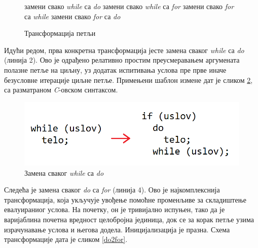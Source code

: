 \documentclass[a4paper]{article}
\newenvironment{algoritam}[1][htb]
{\renewcommand{\algorithmcfname}{Алгоритам}
\begin{figure}[ht]
\centering
  \begin{minipage}{.75\linewidth}
	\begin{algorithm}[#1]%
  }{\end{algorithm}
  \end{minipage}
\end{figure}}
\begin{document}
\begin{algoritam}[H]
\SetAlgoLined
\DontPrintSemicolon
{}
     {замени свако \textit{while} са \textit{do}}
\;
     {замени свако \textit{while} са \textit{for}}
\;
     {замени свако \textit{for} са \textit{while}}
            {замени свако \textit{for} са \textit{do}}
\caption{Трансформација петљи}
\label{alg}
\end{algoritam}

Идући редом, прва конкретна трансформација јесте замена сваког \textit{while} са \textit{do} (линија 2). Ово је одрађено релативно простим преусмеравањем аргумената полазне петље на циљну, уз додатак испитивања услова пре прве иначе безусловне итерације циљне петље. Примењени шаблон измене дат је сликом \ref{while2do}, са разматраном \textit{C}-овском синтаксом.

\begin{figure}[h!]
\begin{center}
\includegraphics[scale=0.6]{while2do.png}
\end{center}
\caption{Замена сваког \textit{while} са \textit{do}}
\label{while2do}
\end{figure}

Следећа је замена сваког \textit{do} са \textit{for} (линија 4). Ово је најкомплекснија трансформација, која укључује увођење помоћне променљиве за складиштење евалуираниог услова. На почетку, он је тривијално испуњен, тако да је варијаблина почетна вредност целобројна јединица, док се за корак петље узима израчунавање услова и његова додела. Иницијализација је празна. Схема трансформације дата је сликом \ref{do2for}.
\end{document}
